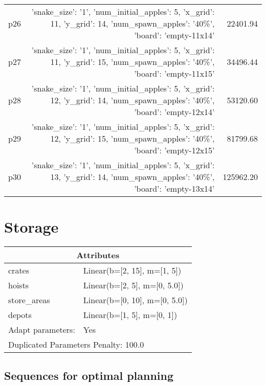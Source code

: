\documentclass{article}
\begin{document}
\begin{center}
\begin{tabular}{@{}l|r|r@{}}
  p26&{'snake\_size': '1', 'num\_initial\_apples': 5, 'x\_grid': 11, 'y\_grid': 14, 'num\_spawn\_apples': '40\%', 'board': 'empty-11x14'}&22401.94\\
  p27&{'snake\_size': '1', 'num\_initial\_apples': 5, 'x\_grid': 11, 'y\_grid': 15, 'num\_spawn\_apples': '40\%', 'board': 'empty-11x15'}&34496.44\\
  p28&{'snake\_size': '1', 'num\_initial\_apples': 5, 'x\_grid': 12, 'y\_grid': 14, 'num\_spawn\_apples': '40\%', 'board': 'empty-12x14'}&53120.60\\
  p29&{'snake\_size': '1', 'num\_initial\_apples': 5, 'x\_grid': 12, 'y\_grid': 15, 'num\_spawn\_apples': '40\%', 'board': 'empty-12x15'}&81799.68\\
  p30&{'snake\_size': '1', 'num\_initial\_apples': 5, 'x\_grid': 13, 'y\_grid': 14, 'num\_spawn\_apples': '40\%', 'board': 'empty-13x14'}&125962.20
                            \end{tabular}
                            \end{center}
                    
                            \newpage \section{Storage}
                    \begin{center}
                    \begin{tabular}{@{}p{}p{}@{}}
                    \multicolumn{2}{c}{\bf \large Attributes}\\\midrule
                    crates & Linear(b=[2, 15], m=[1, 5])\\
hoists & Linear(b=[2, 5], m=[0, 5.0])\\
store\_areas & Linear(b=[0, 10], m=[0, 5.0])\\
depots & Linear(b=[1, 5], m=[0, 1])
                    \\\midrule
                    Adapt parameters: & Yes \\\midrule
                    \multicolumn{2}{l}{Duplicated Parameters Penalty: 100.0}
                    \end{tabular}
                    \end{center}
                
                            \subsection*{Sequences for optimal planning}
\end{document}
